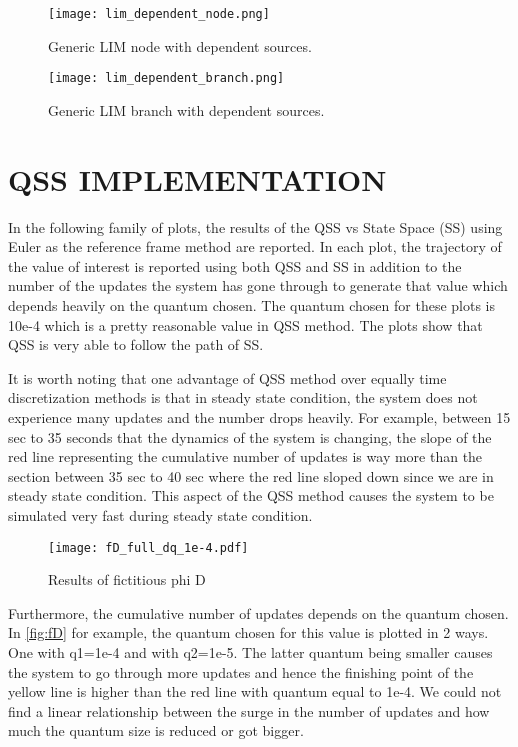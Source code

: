 \documentclass{article}
\theoremstyle{scsthe}
\begin{document}
\begin{figure}[htb]
    \centering
    \texttt{[image: lim\_dependent\_node.png]}
    \caption{Generic LIM node with dependent sources.}
    \label{fig:lim_dependent_node}
\end{figure}

\begin{figure}[htb]
    \centering
    \texttt{[image: lim\_dependent\_branch.png]}
    \caption{Generic LIM branch with dependent sources.}
     \label{fig:lim_dependent_branch}
\end{figure}

\section{QSS IMPLEMENTATION}
In the following family of plots, the results of the QSS vs State Space (SS) using Euler as the reference frame method are reported. In each plot, the trajectory of the value of interest is reported using both QSS and SS in addition to the number of the updates the system has gone through to generate that value which depends heavily on the quantum chosen. The quantum chosen for these plots is 10e-4 which is a pretty reasonable value in QSS method. The plots show that QSS is very able to follow the path of SS. 

It is worth noting that one advantage of QSS method over equally time discretization methods is that in steady state condition, the system does not experience many updates and the number drops heavily. For example, between 15 sec to 35 seconds that the dynamics of the system is changing, the slope of the red line representing the cumulative number of updates is way more than the section between 35 sec to 40 sec where the red line sloped down since we are in steady state condition. This aspect of the QSS method causes the system to be simulated very fast during steady state condition. 
 \begin{figure}[H] 
    \FloatBarrier
    \centering
    \texttt{[image: fD\_full\_dq\_1e-4.pdf]}
    \caption{Results of fictitious phi D}
    \label{fig:fD}
\end{figure}

Furthermore, the cumulative number of updates depends on the quantum chosen. In \autoref{fig:fD} for example, the quantum chosen for this value is plotted in 2 ways. One with q1=1e-4 and with q2=1e-5. The latter quantum being smaller causes the system to go through more updates and hence the finishing point of the yellow line is higher than the red line with quantum equal to 1e-4. We could not find a linear relationship between the surge in the number of updates and how much the quantum size is reduced or got bigger. 
\end{document}
